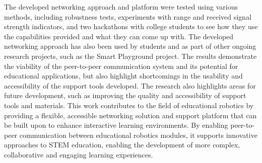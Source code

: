 The developed networking approach and platform were tested using various methods, including robustness tests, experiments with range and received signal strength indicators, and two hackathons with college students to see how they use the capabilities provided and what they can come up with. The developed networking approach has also been used by students and as part of other ongoing research projects, such as the Smart Playground project. The results demonstrate the viability of the peer-to-peer communication system and its potential for educational applications, but also highlight shortcomings in the usability and accessibility of the support tools developed. The research also highlights areas for future development, such as improving the quality and accessibility of support tools and materials. This work contributes to the field of educational robotics by providing a flexible, accessible networking solution and support platform that can be built upon to enhance interactive learning environments. By enabling peer-to-peer communication between educational robotics modules, it supports innovative approaches to STEM education, enabling the development of more complex, collaborative and engaging learning experiences.


